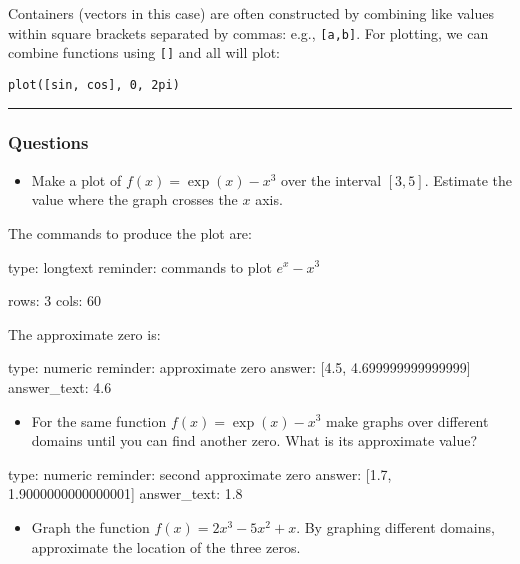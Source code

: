\documentclass[12pt]{article}
\begin{document}
Containers (vectors in this case) are often constructed by combining
like values within square brackets separated by commas: e.g.,
\texttt{{[}a,b{]}}. For plotting, we can combine functions using
\texttt{{[}{]}} and all will plot:



\begin{verbatim}
plot([sin, cos], 0, 2pi)
\end{verbatim}
\begin{center}\rule{3in}{0.4pt}\end{center}

\subsubsection{Questions}

\begin{itemize}
\itemsep1pt\parskip0pt
\item
  Make a plot of $f(x) = \exp(x) - x^3$ over the interval $[3,5]$.
  Estimate the value where the graph crosses the $x$ axis.
\end{itemize}

The commands to produce the plot are:

\begin{answer}
type: longtext
reminder: commands to plot \( e^x - x^3 \)

rows: 3
cols: 60
\end{answer}

The approximate zero is:

\begin{answer}
    type: numeric
    reminder: approximate zero
    answer: [4.5, 4.699999999999999]
answer_text: 4.6 
\end{answer}

\begin{itemize}
\itemsep1pt\parskip0pt
\item
  For the same function $f(x) = \exp(x) - x^3$ make graphs over
  different domains until you can find another zero. What is its
  approximate value?
\end{itemize}

\begin{answer}
    type: numeric
    reminder: second approximate zero
    answer: [1.7, 1.9000000000000001]
answer_text: 1.8 
\end{answer}

\begin{itemize}
\itemsep1pt\parskip0pt
\item
  Graph the function $f(x) = 2x^3 - 5x^2 + x$. By graphing different
  domains, approximate the location of the three zeros.
\end{itemize}
\end{document}
